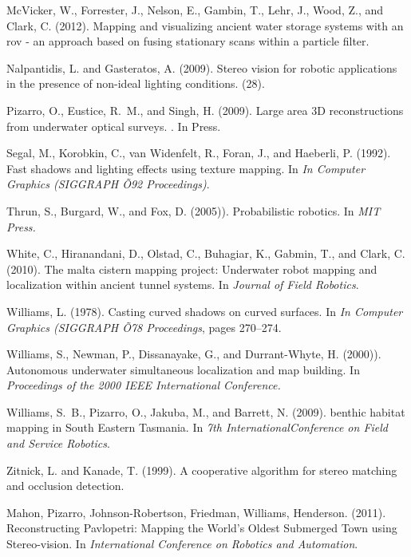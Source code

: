 \documentclass{llncs}
\begin{document}
\begin{thebibliography}{9}
McVicker, W., Forrester, J., Nelson, E., Gambin, T., Lehr, J., Wood, Z., and
  Clark, C. (2012).
\newblock Mapping and visualizing ancient water storage systems with an rov -
  an approach based on fusing stationary scans within a particle filter.

Nalpantidis, L. and Gasteratos, A. (2009).
\newblock Stereo vision for robotic applications in the presence of non-ideal
  lighting conditions.
\newblock (28).

Pizarro, O., Eustice, R.~M., and Singh, H. (2009).
\newblock Large area {3D} reconstructions from underwater optical surveys.
.
\newblock In Press.

Segal, M., Korobkin, C., van Widenfelt, R., Foran, J., and Haeberli, P. (1992).
\newblock Fast shadows and lighting effects using texture mapping.
\newblock In {\em In Computer Graphics (SIGGRAPH Õ92 Proceedings)}.

Thrun, S., Burgard, W., and Fox, D. (2005)).
\newblock Probabilistic robotics.
\newblock In {\em MIT Press.}

White, C., Hiranandani, D., Olstad, C., Buhagiar, K., Gabmin, T., and Clark, C.
  (2010).
\newblock The malta cistern mapping project: Underwater robot mapping and
  localization within ancient tunnel systems.
\newblock In {\em Journal of Field Robotics}.

Williams, L. (1978).
\newblock Casting curved shadows on curved surfaces.
\newblock In {\em In Computer Graphics (SIGGRAPH Õ78 Proceedings}, pages
  270--274.

Williams, S., Newman, P., Dissanayake, G., and Durrant-Whyte, H. (2000)).
\newblock Autonomous underwater simultaneous localization and map building.
\newblock In {\em Proceedings of the 2000 IEEE International Conference.}

Williams, S.~B., Pizarro, O., Jakuba, M., and Barrett, N. (2009).
 benthic habitat mapping in {S}outh {E}astern {T}asmania.
\newblock In {\em 7th InternationalConference on Field and Service Robotics}.

Zitnick, L. and Kanade, T. (1999).
\newblock A cooperative algorithm for stereo matching and occlusion detection.

Mahon, Pizarro, Johnson-Robertson, Friedman, Williams, Henderson. (2011).
\newblock Reconstructing Pavlopetri: Mapping the World's Oldest Submerged Town using Stereo-vision.
\newblock In {\em International Conference on Robotics and Automation}.


\end{thebibliography}
\end{document}
